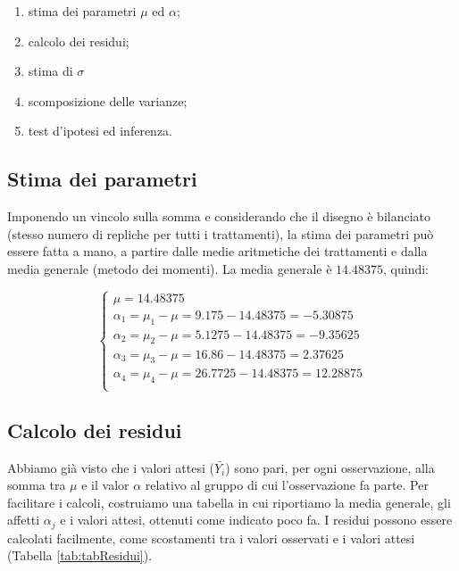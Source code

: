 \documentclass[a4paper,12pt,oneside]{book}
\providecommand{\tightlist}{%
  \setlength{\itemsep}{0pt}\setlength{\parskip}{0pt}}
\begin{document}
\begin{enumerate}
\def\labelenumi{\arabic{enumi}.}
\tightlist
\item
  stima dei parametri \(\mu\) ed \(\alpha\);
\item
  calcolo dei residui;
\item
  stima di \(\sigma\)
\item
  scomposizione delle varianze;
\item
  test d'ipotesi ed inferenza.
\end{enumerate}

\hypertarget{stima-dei-parametri}{%
\subsection{Stima dei parametri}\label{stima-dei-parametri}}

Imponendo un vincolo sulla somma e considerando che il disegno è bilanciato (stesso numero di repliche per tutti i trattamenti), la stima dei parametri può essere fatta a mano, a partire dalle medie aritmetiche dei trattamenti e dalla media generale (metodo dei momenti). La media generale è \(14.48375\), quindi:

\[ \left\{ {\begin{array}{l}
\mu = 14.48375\\
\alpha_1 = \mu_1 - \mu = 9.175 - 14.48375 =  - 5.30875\\
\alpha_2 = \mu_2 - \mu = 5.1275 - 14.48375 =  - 9.35625\\
\alpha_3 = \mu_3 - \mu = 16.86 - 14.48375 =  2.37625\\
\alpha_4 = \mu_4 - \mu = 26.7725 - 14.48375 =  12.28875\\
\end{array}} \right.\]

\hypertarget{calcolo-dei-residui}{%
\subsection{Calcolo dei residui}\label{calcolo-dei-residui}}

Abbiamo già visto che i valori attesi (\(\bar{Y_i}\)) sono pari, per ogni osservazione, alla somma tra \(\mu\) e il valor \(\alpha\) relativo al gruppo di cui l'osservazione fa parte. Per facilitare i calcoli, costruiamo una tabella in cui riportiamo la media generale, gli affetti \(\alpha_j\) e i valori attesi, ottenuti come indicato poco fa. I residui possono essere calcolati facilmente, come scostamenti tra i valori osservati e i valori attesi (Tabella \ref{tab:tabResidui}).
\end{document}
